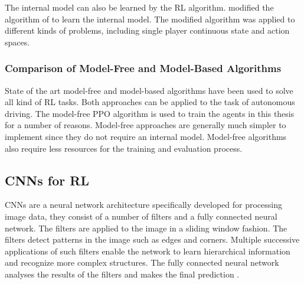 The internal model can also be learned by the \ac{RL} algorithm. \textcite{alphagoimprovementmuzero} modified the algorithm of \textcite{alphago} to learn the internal model. The modified algorithm was applied to different kinds of problems, including single player continuous state and action spaces. 




\subsubsection{Comparison of Model-Free and Model-Based Algorithms}

State of the art model-free and model-based algorithms have been used to solve all kind of \ac{RL} tasks. Both approaches can be applied to the task of autonomous driving. The model-free \ac{PPO} algorithm is used to train the agents in this thesis for a number of reasons. Model-free approaches are generally much simpler to implement since they do not require an internal model. Model-free algorithms also require less resources for the training and evaluation process.




\subsection{\acp{CNN} for \ac{RL}}

\acp{CNN} are a neural network architecture specifically developed for processing image data, they consist of a number of filters and a fully connected neural network. The filters are applied to the image in a sliding window fashion. The filters detect patterns in the image such as edges and corners. Multiple successive applications of such filters enable the network to learn hierarchical information and recognize more complex structures. The fully connected neural network analyses the results of the filters and makes the final prediction \textcite{rlbook2020}.

